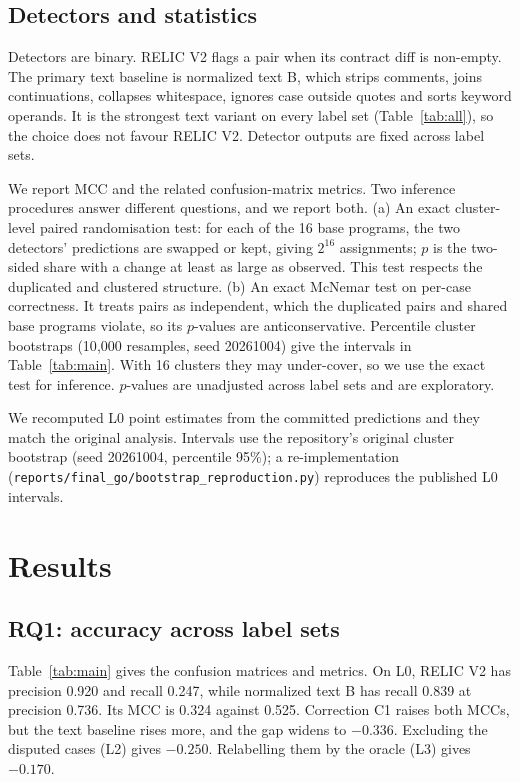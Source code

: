 \documentclass[conference]{IEEEtran}
\begin{document}
\subsection{Detectors and statistics}\label{sec:stats}
Detectors are binary. RELIC V2 flags a pair when its contract diff is non-empty. The primary text baseline is normalized text B, which strips comments, joins continuations, collapses whitespace, ignores case outside quotes and sorts keyword operands. It is the strongest text variant on every label set (Table~\ref{tab:all}), so the choice does not favour RELIC V2. Detector outputs are fixed across label sets.

We report MCC and the related confusion-matrix metrics. Two inference procedures answer different questions, and we report both. (a) An exact cluster-level paired randomisation test: for each of the 16 base programs, the two detectors' predictions are swapped or kept, giving $2^{16}$ assignments; $p$ is the two-sided share with a change at least as large as observed. This test respects the duplicated and clustered structure. (b) An exact McNemar test on per-case correctness. It treats pairs as independent, which the duplicated pairs and shared base programs violate, so its $p$-values are anticonservative. Percentile cluster bootstraps (10{,}000 resamples, seed 20261004) give the intervals in Table~\ref{tab:main}. With 16 clusters they may under-cover, so we use the exact test for inference. $p$-values are unadjusted across label sets and are exploratory.

We recomputed L0 point estimates from the committed predictions and they match the original analysis. Intervals use the repository's original cluster bootstrap (seed 20261004, percentile 95\%); a re-implementation (\texttt{reports/final\_go/bootstrap\_reproduction.py}) reproduces the published L0 intervals.

\section{Results}
\subsection{RQ1: accuracy across label sets}
Table~\ref{tab:main} gives the confusion matrices and metrics. On L0, RELIC V2 has precision 0.920 and recall 0.247, while normalized text B has recall 0.839 at precision 0.736. Its MCC is 0.324 against 0.525. Correction C1 raises both MCCs, but the text baseline rises more, and the gap widens to $-0.336$. Excluding the disputed cases (L2) gives $-0.250$. Relabelling them by the oracle (L3) gives $-0.170$.
\end{document}

